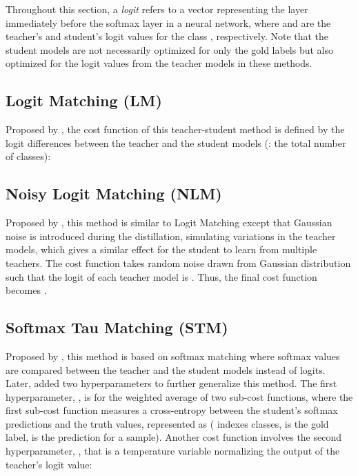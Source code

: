 \documentclass{article}
\begin{document}
Throughout this section, a \textit{logit} refers to a vector representing the layer immediately before the softmax layer in a neural network, where  and   are the teacher's and student's logit values for the class , respectively.
Note that the student models are not necessarily optimized for only the gold labels but also optimized for the logit values from the teacher models in these methods.
















\subsection{Logit Matching (LM)}
\label{ssec:logit}

Proposed by \cite{ba2014deep}, the cost function of this teacher-student method is defined by the logit differences between the teacher and the student models (: the total number of classes):\vspace{-2.5ex}



\subsection{Noisy Logit Matching (NLM)}
\label{ssec:nlogit}

Proposed by \cite{sau2016deep}, this method is similar to Logit Matching except that Gaussian noise is introduced during the distillation, simulating variations in the teacher models, 
which gives a similar effect for the student to learn from multiple teachers.
The cost function takes random noise  drawn from Gaussian distribution such that the logit of each teacher model is .
Thus, the final cost function becomes .


\subsection{Softmax Tau Matching (STM)}
\label{ssec:stm}

Proposed by \cite{hinton2015distilling}, this method is based on softmax matching where softmax values are compared between the teacher and the student models instead of logits.
Later, \cite{hinton2015distilling} added two hyperparameters to further generalize this method.
The first hyperparameter, , is for the weighted average of two sub-cost functions, where the first sub-cost function measures a cross-entropy between the student's softmax predictions and the truth values, represented as  (  indexes classes,  is the gold label,  is the prediction for a sample).
Another cost function involves the second hyperparameter, , that is a temperature variable normalizing the output of the teacher's logit value:
\vspace{-1ex}
\end{document}

